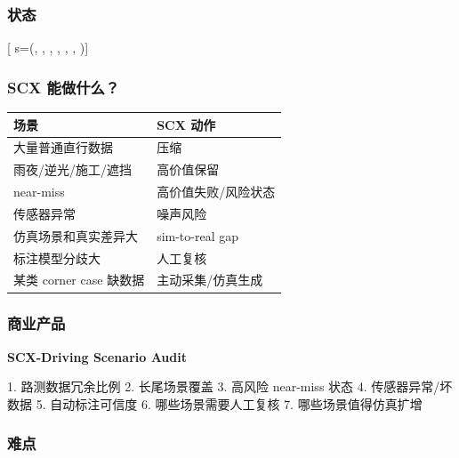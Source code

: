 \documentclass[
  12pt,
]{ctexart}
\newenvironment{Shaded}{}{}
\newcommand{\NormalTok}[1]{#1}
\begin{document}
\subsubsection{状态}\label{ux72b6ux6001-1}

{[} s=(, , ,
, , ,
){]}

\subsubsection{SCX 能做什么？}\label{scx-ux80fdux505aux4ec0ux4e48-2}

\begin{longtable}[]{@{}ll@{}}
\toprule\noalign{}
场景 & SCX 动作 \\
\midrule\noalign{}
\endhead
\bottomrule\noalign{}
\endlastfoot
大量普通直行数据 & 压缩 \\
雨夜/逆光/施工/遮挡 & 高价值保留 \\
near-miss & 高价值失败/风险状态 \\
传感器异常 & 噪声风险 \\
仿真场景和真实差异大 & sim-to-real gap \\
标注模型分歧大 & 人工复核 \\
某类 corner case 缺数据 & 主动采集/仿真生成 \\
\end{longtable}

\subsubsection{商业产品}\label{ux5546ux4e1aux4ea7ux54c1}

\textbf{SCX-Driving Scenario Audit}

\begin{Shaded}
\begin{Highlighting}[]
\NormalTok{1. 路测数据冗余比例}
\NormalTok{2. 长尾场景覆盖}
\NormalTok{3. 高风险 near{-}miss 状态}
\NormalTok{4. 传感器异常/坏数据}
\NormalTok{5. 自动标注可信度}
\NormalTok{6. 哪些场景需要人工复核}
\NormalTok{7. 哪些场景值得仿真扩增}
\end{Highlighting}
\end{Shaded}

\subsubsection{难点}\label{ux96beux70b9-1}
\end{document}
